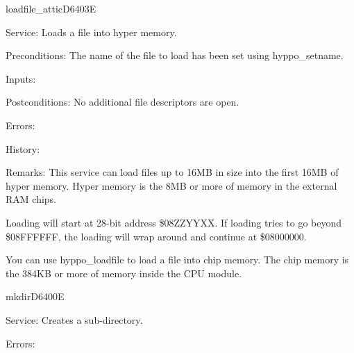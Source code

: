 \newpage
\begin{hyppotrap}{loadfile\_attic}{D640}{3E}
\item [Service:]
  Loads a file into hyper memory.
\item [Preconditions:]
  The name of the file to load has been set using hyppo\_setname.
\item [Inputs:]
\item [Postconditions:]
  No additional file descriptors are open.
\item [Errors:]
\item [History:]
\item [Remarks:]
  This service can load files up to 16MB in size into the first 16MB of hyper
  memory. Hyper memory is the 8MB or more of memory in the external RAM chips.

  Loading will start at 28-bit address \$08ZZYYXX. If loading tries to go beyond
  \$08FFFFFF, the loading will wrap around and continue at \$08000000.

  You can use hyppo\_loadfile to load a file into chip memory. The chip memory is
  the 384KB or more of memory inside the CPU module.
\end{hyppotrap}


\newpage
\begin{hyppotrap}{mkdir}{D640}{0E}
\item [Service:]
  Creates a sub-directory.
\item [Errors:]
\notimplemented
\end{hyppotrap}


